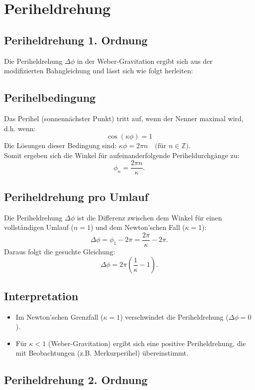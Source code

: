 \newpage
\section{Periheldrehung}
\subsection{Periheldrehung 1. Ordnung}
Die Periheldrehung $\Delta\phi$ in der Weber-Gravitation ergibt sich aus der modifizierten Bahngleichung und lässt sich wie folgt herleiten:

\subsection*{Perihelbedingung}
Das Perihel (sonnennächster Punkt) tritt auf, wenn der Nenner maximal wird, d.h. wenn:\\
\[\cos(\kappa\phi) = 1\]
Die Lösungen dieser Bedingung sind: $\kappa\phi = 2\pi n \quad \text{(für $n \in \mathbb{Z}$)}$.\\

Somit ergeben sich die Winkel für aufeinanderfolgende Periheldurchgänge zu:
\[
    \phi_n = \frac{2\pi n}{\kappa}.
\]

\subsection*{Periheldrehung pro Umlauf}
Die Periheldrehung $\Delta\phi$ ist die Differenz zwischen dem Winkel für einen vollständigen Umlauf ($n = 1$) und dem Newton'schen Fall ($\kappa = 1$):
\[
    \Delta\phi = \phi_1 - 2\pi = \frac{2\pi}{\kappa} - 2\pi.
\]
Daraus folgt die gesuchte Gleichung:
\begin{equation}
\boxed
{
    \Delta\phi = 2\pi\left(\frac{1}{\kappa} - 1\right)
}.
\end{equation}

\subsection*{Interpretation}
\begin{itemize}
\item Im Newton'schen Grenzfall ($\kappa = 1$) verschwindet die Periheldrehung ($\Delta\phi = 0$).
\item Für $\kappa < 1$ (Weber-Gravitation) ergibt sich eine positive Periheldrehung, die mit Beobachtungen (z.B. Merkurperihel) übereinstimmt.
\end{itemize}

\subsection{Periheldrehung 2. Ordnung}
